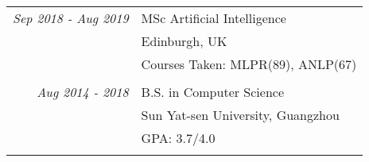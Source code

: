 \documentclass[a4paper,10pt]{article} %
\begin{document}
\begin{tabular}{r|p{11cm}}
\emph{Sep 2018 - Aug 2019} & MSc Artificial Intelligence \\
& Edinburgh, UK\\ 
& Courses Taken: MLPR(89), ANLP(67)\\


\multicolumn{2}{c}{} \\
	
	
\emph{Aug 2014 - 2018} & B.S. in Computer Science \\
& Sun Yat-sen University, Guangzhou\\ 
& GPA: 3.7/4.0 \\


\multicolumn{2}{c}{} \\

\end{tabular}
\end{document}

